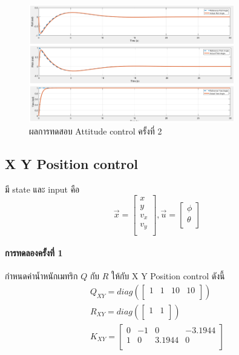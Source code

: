 \begin{figure}[!ht]
	\centering
	\includegraphics[width=0.8\textwidth]{images/simulink/attitude_control2.png}
	\caption{ผลการทดสอบ Attitude control ครั้งที่ 2}
\end{figure}


\subsection{X Y Position control}
มี state และ input คือ
\begin{equation}
    {\vec{x}=\begin{bmatrix}
        x \\ y \\ v_x \\ v_y \\
    \end{bmatrix}, \vec{u} = \begin{bmatrix}
        \phi \\ \theta \\
    \end{bmatrix}}
\end{equation}

\paragraph*{การทดลองครั้งที่ 1}
กำหนดค่าน้ำหนักเมทริก $Q$ กับ $R$ ให้กับ X Y Position control ดังนี้
\begin{equation}
    \begin{array}{c}
    {Q_{XY}=diag(\begin{bmatrix}
        1 & 1 & 10 & 10 \\
    \end{bmatrix})}\\[10pt]
    {R_{XY} = diag(\begin{bmatrix}
        1 & 1 \\
    \end{bmatrix})}\\[10pt]
    {K_{XY} = \begin{bmatrix}
        0 & -1 & 0 & -3.1944 \\
        1 & 0 & 3.1944 & 0 \\
    \end{bmatrix}} \\[10pt]
    \end{array}
\end{equation}

